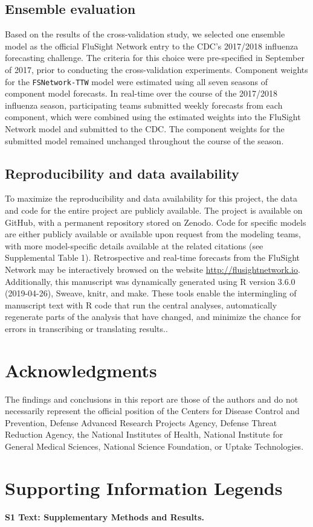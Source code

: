 \documentclass{article}\usepackage[]{graphicx}\usepackage[]{color}
\begin{document}
\subsection*{Ensemble evaluation}

Based on the results of the cross-validation study, we selected one ensemble model as the official FluSight Network entry to the CDC's 2017/2018 influenza forecasting challenge.
The criteria for this choice were pre-specified in September of 2017, prior to conducting the cross-validation experiments.\cite{Reich2017github} 
Component weights for the {\tt FSNetwork-TTW} model were estimated using all seven seasons of component model forecasts. In real-time over the course of the 2017/2018 influenza season, participating teams submitted weekly forecasts from each component, which were combined using the estimated weights into the FluSight Network model and submitted to the CDC. The component weights for the submitted model remained unchanged throughout the course of the season.

\subsection*{Reproducibility and data availability}

To maximize the reproducibility and data availability for this project, the data and code for the entire project are publicly available.
The project is available on GitHub\cite{fsngithub2018}, with a permanent repository stored on Zenodo\cite{fsnzenodo2018}.
Code for specific models are either publicly available or available upon request from the modeling teams, with more model-specific details available at the related citations (see Supplemental Table 1).
Retrospective and real-time forecasts from the FluSight Network may be interactively browsed on the website \url{http://flusightnetwork.io}.
Additionally, this manuscript was dynamically generated using R version 3.6.0 (2019-04-26), Sweave, knitr, and make.
These tools enable the intermingling of manuscript text with R code that run the central analyses, automatically regenerate parts of the analysis that have changed, and minimize the chance for errors in transcribing or translating results.\cite{Xie2015,RCore2017}.


\section*{Acknowledgments}
The findings and conclusions in this report are those of the authors and do not necessarily represent the official position of the Centers for Disease Control and Prevention, Defense Advanced Research Projects Agency, Defense Threat Reduction Agency, the National Institutes of Health, National Institute for General Medical Sciences, National Science Foundation, or Uptake Technologies.




\section*{Supporting Information Legends}

{\bf S1 Text: Supplementary Methods and Results.}
\end{document}
